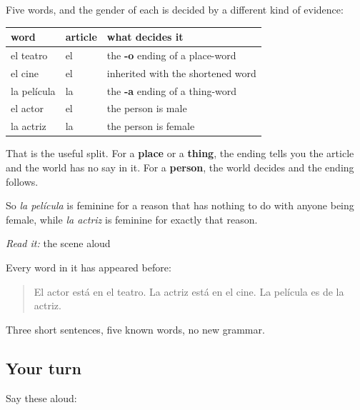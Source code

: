 \begin{grammarlens}[title={Grammar Lens: places, things and people take different endings}]
Five words, and the gender of each is decided by a different kind of evidence:

\noindent
\begin{tabularx}{\linewidth}{@{}>{\raggedright\arraybackslash}X>{\raggedright\arraybackslash}X>{\raggedright\arraybackslash}X@{}}
\toprule
\textbf{word} & \textbf{article} & \textbf{what decides it} \\
\midrule
el teatro & el & the \textbf{-o} ending of a place-word \\
el cine & el & inherited with the shortened word \\
la película & la & the \textbf{-a} ending of a thing-word \\
el actor & el & the person is male \\
la actriz & la & the person is female \\
\bottomrule
\end{tabularx}

That is the useful split. For a \textbf{place} or a \textbf{thing}, the ending tells you the article and the world has no say in it. For a \textbf{person}, the world decides and the ending follows.

So \emph{la película} is feminine for a reason that has nothing to do with anyone being female, while \emph{la actriz} is feminine for exactly that reason.
\end{grammarlens}

\begin{tcolorbox}[breakable,skin=enhanced,colback=orange!6,colframe=orange!45!black,boxrule=0.5pt,arc=1mm,left=6pt,right=6pt,top=4pt,bottom=4pt,fonttitle=\bfseries,title={Read this}]
\emph{Read it:} the scene aloud

Every word in it has appeared before:

\begin{quote}
El actor está en el teatro. La actriz está en el cine. La película es de la actriz.
\end{quote}

Three short sentences, five known words, no new grammar.
\end{tcolorbox}

\subsection*{Your turn}
Say these aloud:

